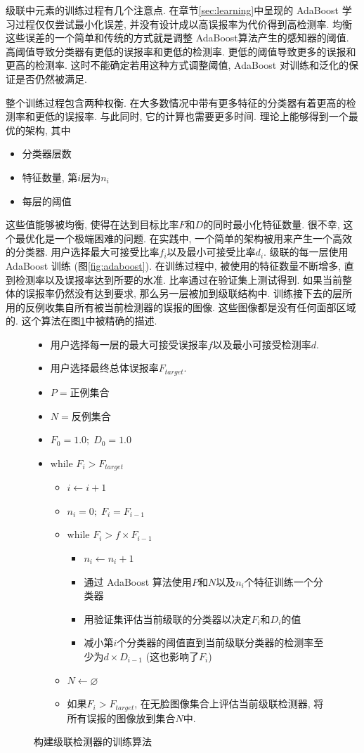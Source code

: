 \documentclass[a4paper,utf8,11pt]{ctexart}
\begin{document}
级联中元素的训练过程有几个注意点. 在章节\ref{sec:learning}中呈现的 AdaBoost 学习过程仅仅尝试最小化误差, 并没有设计成以高误报率为代价得到高检测率. 均衡这些误差的一个简单和传统的方式就是调整 AdaBoost算法产生的感知器的阈值. 高阈值导致分类器有更低的误报率和更低的检测率. 更低的阈值导致更多的误报和更高的检测率. 这时不能确定若用这种方式调整阈值, AdaBoost 对训练和泛化的保证是否仍然被满足.

整个训练过程包含两种权衡. 在大多数情况中带有更多特征的分类器有着更高的检测率和更低的误报率. 与此同时, 它的计算也需要更多时间. 理论上能够得到一个最优的架构, 其中
\begin{itemize}
\item 分类器层数
\item 特征数量, 第$i$层为$n_i$
\item 每层的阈值
\end{itemize}
这些值能够被均衡, 使得在达到目标比率$F$和$D$的同时最小化特征数量. 很不幸, 这个最优化是一个极端困难的问题.
在实践中, 一个简单的架构被用来产生一个高效的分类器. 用户选择最大可接受比率$f_i$以及最小可接受比率$d_i$. 级联的每一层使用 AdaBoost 训练 (图\ref{fig:adaboost}). 在训练过程中, 被使用的特征数量不断增多, 直到检测率以及误报率达到所要的水准. 比率通过在验证集上测试得到. 如果当前整体的误报率仍然没有达到要求, 那么另一层被加到级联结构中. 训练接下去的层所用的反例收集自所有被当前检测器的误报的图像. 这些图像都是没有任何面部区域的. 这个算法在图\ref{fig:train}中被精确的描述.
\begin{figure}[!htb]
  \caption{构建级联检测器的训练算法}
  \label{fig:train}
  \kaishu{}
  \begin{itemize}
  \item 用户选择每一层的最大可接受误报率$f$以及最小可接受检测率$d$.
  \item 用户选择最终总体误报率$F_{target}$.
  \item $P=$正例集合
  \item $N=$反例集合
  \item $F_0=1.0;\;D_0=1.0$
  \item while $F_i>F_{target}$
    \begin{itemize}
    \item $i\leftarrow i+1$
    \item $n_i=0;\;F_i=F_{i-1}$
    \item while $F_i>f\times F_{i-1}$
      \begin{itemize}
      \item $n_i\leftarrow n_i+1$
      \item 通过 AdaBoost 算法使用$P$和$N$以及$n_i$个特征训练一个分类器
      \item 用验证集评估当前级联的分类器以决定$F_i$和$D_i$的值
      \item 减小第$i$个分类器的阈值直到当前级联分类器的检测率至少为$d\times D_{i-1}$ (这也影响了$F_i$)
      \end{itemize}
    \item $N\leftarrow\varnothing$
    \item 如果$F_i>F_{target}$, 在无脸图像集合上评估当前级联检测器, 将所有误报的图像放到集合$N$中.
    \end{itemize}
\end{itemize}
\end{figure}
\end{document}

